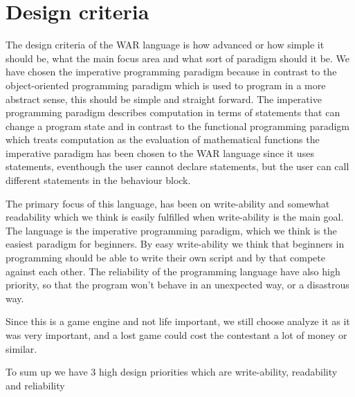 
\section{Design criteria}

The design criteria of the WAR language is how advanced or how simple it should be, what the main focus area and what sort of paradigm should it be. We have chosen the imperative programming paradigm because in contrast to the object-oriented programming paradigm which is used to program in a more abstract sense, this should be simple and straight forward. The imperative programming paradigm describes computation in terms of statements that can change a program state and in contrast to the functional programming paradigm which treats computation as the evaluation of mathematical functions the imperative paradigm has been chosen to the WAR language since it uses statements, eventhough the user cannot declare statements, but the user can call different statements in the behaviour block. 


The primary focus of this language, has been on write-ability and somewhat readability which we think is easily fulfilled when write-ability is the main goal. The language is the imperative programming paradigm, which we think is the easiest paradigm for beginners. By easy write-ability we think that beginners in programming should be able to write their own script and by that compete against each other. The reliability of the programming language have also high priority, so that the program won't behave in an unexpected way, or a disastrous way.

 
Since this is a game engine and not life important, we still choose analyze it as it was very important, and a lost game could cost the contestant a lot of money or similar.

To sum up we have 3 high design priorities which are write-ability, readability and reliability